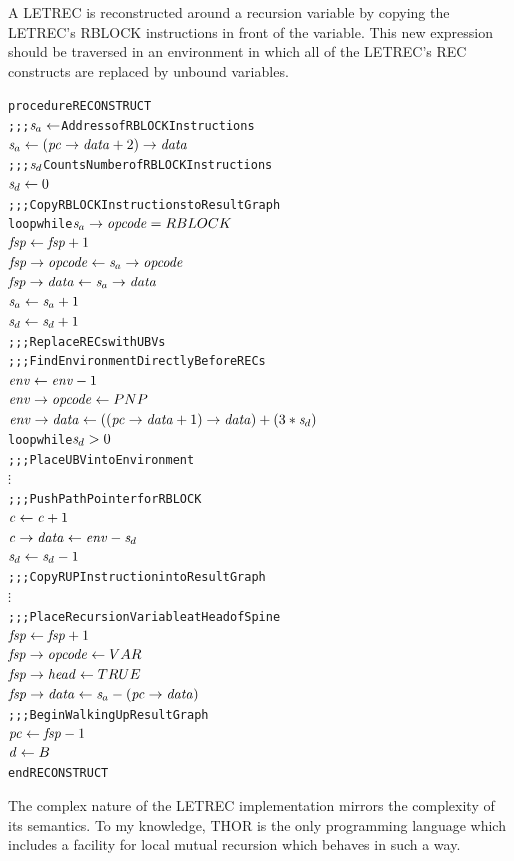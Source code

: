 A LETREC is reconstructed around a recursion variable by copying the LETREC's RBLOCK
instructions in front of the variable. This new expression should be traversed in an
environment in which all of the LETREC's REC constructs are replaced by unbound variables.


\begin{alltt}
procedure RECONSTRUCT
  ;;; \(\rtsa \leftarrow\) Address of RBLOCK Instructions
  \(\rtsa \leftarrow (\rtfield{pc}{data}+2)\rightarrow\mathit{data}\)
  ;;; \(\rtsd\) Counts Number of RBLOCK Instructions
  \(\rtsd \leftarrow 0\)
  ;;; Copy RBLOCK Instructions to Result Graph
  loop while \(\rtsa\rightarrow\mathit{opcode} = RBLOCK\)
    \(\rt{fsp} \leftarrow \rt{fsp}+1\)
    \(\rtfield{fsp}{opcode} \leftarrow \rtsa\rightarrow\mathit{opcode}\)
    \(\rtfield{fsp}{data} \leftarrow \rtsa\rightarrow\mathit{data}\)
    \(\rtsa \leftarrow \rtsa+1\)
    \(\rtsd \leftarrow \rtsd+1\)
  ;;; Replace RECs with UBVs
  ;;; Find Environment Directly Before RECs
  \(\rt{env} \leftarrow \rt{env}-1\)
  \(\rtfield{env}{opcode} \leftarrow PNP\)
  \(\rtfield{env}{data} \leftarrow ((\rtfield{pc}{data}+1)\rightarrow\mathit{data})+(3*\rtsd)\)
  loop while \(\rtsd > 0\)
    ;;; Place UBV into Environment
    \(\vdots\)
    ;;; Push Path Pointer for RBLOCK
    \(\rt{c} \leftarrow \rt{c}+1\)
    \(\rtfield{c}{data} \leftarrow \rt{env}-\rtsd\)
    \(\rtsd \leftarrow \rtsd-1\)
  ;;; Copy RUP Instruction into Result Graph
  \(\vdots\)
  ;;; Place Recursion Variable at Head of Spine
  \(\rt{fsp} \leftarrow \rt{fsp}+1\)
  \(\rtfield{fsp}{opcode} \leftarrow VAR\)
  \(\rtfield{fsp}{head} \leftarrow TRUE\)
  \(\rtfield{fsp}{data} \leftarrow \rtsa-(\rtfield{pc}{data})\)
  ;;; Begin Walking Up Result Graph
  \(\rt{pc} \leftarrow \rt{fsp}-1\)
  \(\rt{d} \leftarrow B\)
end RECONSTRUCT
\end{alltt}

The complex nature of the LETREC implementation mirrors the complexity of its semantics.
To my knowledge, THOR is the only programming language which includes a facility for local
mutual recursion which behaves in such a way.
